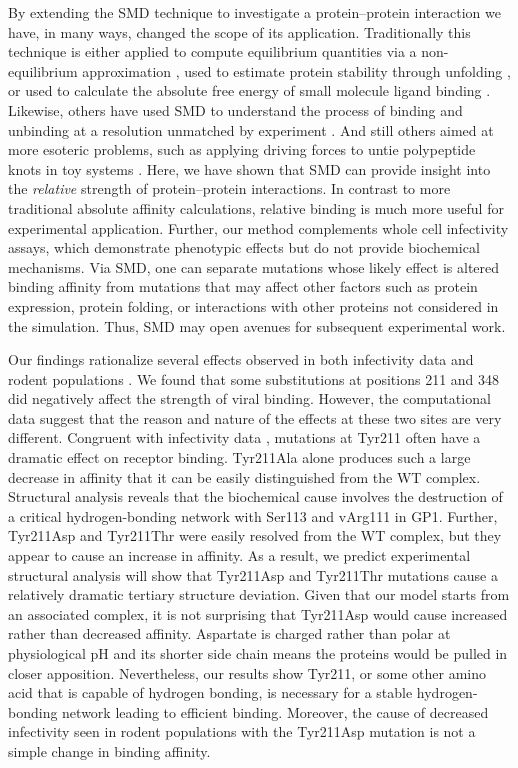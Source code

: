 \documentclass[12pt]{article}
\begin{document}
By extending the SMD technique to investigate a protein--protein interaction we have, in many ways, changed the scope of its application. Traditionally this technique is either applied to compute equilibrium quantities via a non-equilibrium approximation \citep{Park2003,Park2004,Buch2011,Giorgino2012}, used to estimate protein stability through unfolding \citep{Lu1999}, or used to calculate the absolute free energy of small molecule ligand binding \citep{Dixit2001}. Likewise, others have used SMD to understand the process of binding and unbinding at a resolution unmatched by experiment \citep{Cuendet2011,Giorgino2012}. And still others aimed at more esoteric problems, such as applying driving forces to untie polypeptide knots in toy systems \citep{Sulkowska2010}. Here, we have shown that SMD can provide insight into the \textit{relative} strength of protein--protein interactions. In contrast to more traditional absolute affinity calculations, relative binding is much more useful for experimental application. Further, our method complements whole cell infectivity assays, which demonstrate phenotypic effects but do not provide biochemical mechanisms. Via SMD, one can separate mutations whose likely effect is altered binding affinity from mutations that may affect other factors such as protein expression, protein folding, or interactions with other proteins not considered in the simulation. Thus, SMD may open avenues for subsequent experimental work.

Our findings rationalize several effects observed in both infectivity data and rodent populations \citep{Rad2008,Rad20111}. We found that some substitutions at positions 211 and 348 did negatively affect the strength of viral binding. However, the computational data suggest that the reason and nature of the effects at these two sites are very different. Congruent with infectivity data \citep{Rad2008,Rad20111}, mutations at Tyr211 often have a dramatic effect on receptor binding. Tyr211Ala alone produces such a large decrease in affinity that it can be easily distinguished from the WT complex. Structural analysis reveals that the biochemical cause involves the destruction of a critical hydrogen-bonding network with Ser113 and vArg111 in GP1. Further, Tyr211Asp and Tyr211Thr were easily resolved from the WT complex, but they appear to cause an increase in affinity. As a result, we predict experimental structural analysis will show that Tyr211Asp and Tyr211Thr mutations cause a relatively dramatic tertiary structure deviation. Given that our model starts from an associated complex, it is not surprising that Tyr211Asp would cause increased rather than decreased affinity. Aspartate is charged rather than polar at physiological pH and its shorter side chain means the proteins would be pulled in closer apposition. Nevertheless, our results show Tyr211, or some other amino acid that is capable of hydrogen bonding, is necessary for a stable hydrogen-bonding network leading to efficient binding. Moreover, the cause of decreased infectivity seen in rodent populations with the Tyr211Asp mutation is not a simple change in binding affinity.
\end{document}
